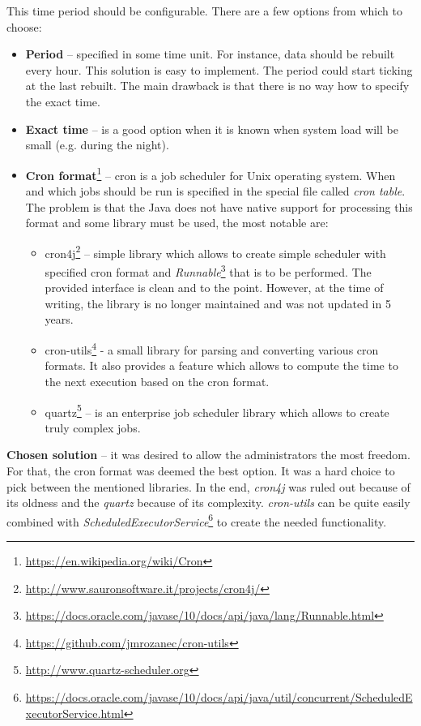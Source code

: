 This time period should be configurable. There are a few options from which to choose:
\begin{itemize}
    \item \textbf{Period} – specified in some time unit. For instance, data should be rebuilt every hour. This solution
    is easy to implement. The period could start ticking at the last rebuilt. The main drawback is that there is no way
    how to specify the exact time.
    \item \textbf{Exact time} – is a good option when it is known when system load will be small (e.g. during the night).
    \item \textbf{Cron format}\footnote{\url{https://en.wikipedia.org/wiki/Cron}} – \label{cron} cron is a job scheduler for Unix
    operating system. When and which jobs should be run is specified in the special file called \textit{cron table}. The problem
    is that the Java does not have native support for processing this format and some library must be used, the most notable are:
    \begin{itemize}
        \item cron4j\footnote{\url{http://www.sauronsoftware.it/projects/cron4j/}} – simple library which allows to
        create simple scheduler with specified cron format and
        \textit{Runnable}\footnote{\url{https://docs.oracle.com/javase/10/docs/api/java/lang/Runnable.html}} that is to be performed.
        The provided interface is clean and to the point. However, at the time of writing, the library is no longer maintained and
        was not updated in 5 years.
        \item cron-utils\footnote{\url{https://github.com/jmrozanec/cron-utils}} - a small library for parsing and
        converting various cron formats. It also provides a feature which allows to compute the time to the next execution
        based on the cron format.
        \item quartz\footnote{\url{http://www.quartz-scheduler.org}} – is an enterprise job scheduler library which
        allows to create truly complex jobs.
    \end{itemize}
\end{itemize}

\textbf{Chosen solution} – it was desired to allow the administrators the most freedom. For that, the cron format was
deemed the best option. It was a hard choice to pick between the mentioned libraries. In the end, \textit{cron4j} was ruled out
because of its oldness and the \textit{quartz} because of its complexity. \textit{cron-utils} can be quite easily combined with
\textit{ScheduledExecutorService}\footnote{\url{https://docs.oracle.com/javase/10/docs/api/java/util/concurrent/ScheduledExecutorService.html}}
to create the needed functionality.

